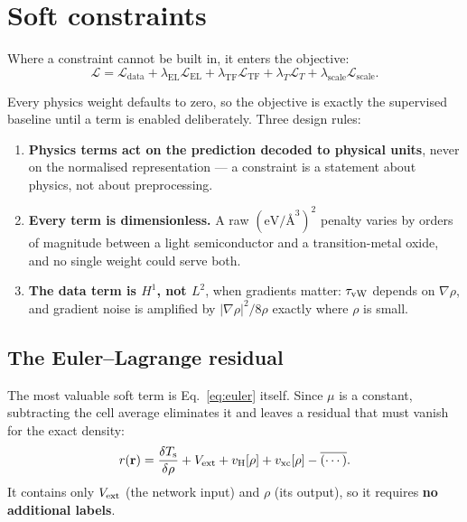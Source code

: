 \section{Soft constraints}

Where a constraint cannot be built in, it enters the objective:
\begin{equation}
  \mathcal{L} = \mathcal{L}_{\mathrm{data}}
    + \lambda_{\mathrm{EL}}\mathcal{L}_{\mathrm{EL}}
    + \lambda_{\mathrm{TF}}\mathcal{L}_{\mathrm{TF}}
    + \lambda_{T}\mathcal{L}_{T}
    + \lambda_{\mathrm{scale}}\mathcal{L}_{\mathrm{scale}} .
\end{equation}

Every physics weight defaults to zero, so the objective is exactly the
supervised baseline until a term is enabled deliberately. Three design rules:

\begin{enumerate}
  \item \textbf{Physics terms act on the prediction decoded to physical units},
    never on the normalised representation --- a constraint is a statement about
    physics, not about preprocessing.
  \item \textbf{Every term is dimensionless.} A raw
    $(\mathrm{eV}/\text{\AA}^3)^2$ penalty varies by orders of magnitude between
    a light semiconductor and a transition-metal oxide, and no single weight
    could serve both.
  \item \textbf{The data term is $H^1$, not $L^2$}, when gradients matter:
    $\tau_{\mathrm{vW}}$ depends on $\nabla\rho$, and gradient noise is amplified by
    $|\nabla\rho|^2/8\rho$ exactly where $\rho$ is small.
\end{enumerate}

\subsection{The Euler--Lagrange residual}

The most valuable soft term is Eq.~\eqref{eq:euler} itself. Since $\mu$ is a
constant, subtracting the cell average eliminates it and leaves a residual that
must vanish for the exact density:
\begin{equation}
  r(\mathbf{r}) = \frac{\delta T_{\mathrm{s}}}{\delta\rho} + V_{\mathrm{ext}} + v_{\mathrm{H}}[\rho] + v_{\mathrm{xc}}[\rho]
           - \overline{(\cdots)} .
  \label{eq:elresidual}
\end{equation}
It contains only $V_{\mathrm{ext}}$ (the network input) and $\rho$ (its output), so it
requires \textbf{no additional labels}.

